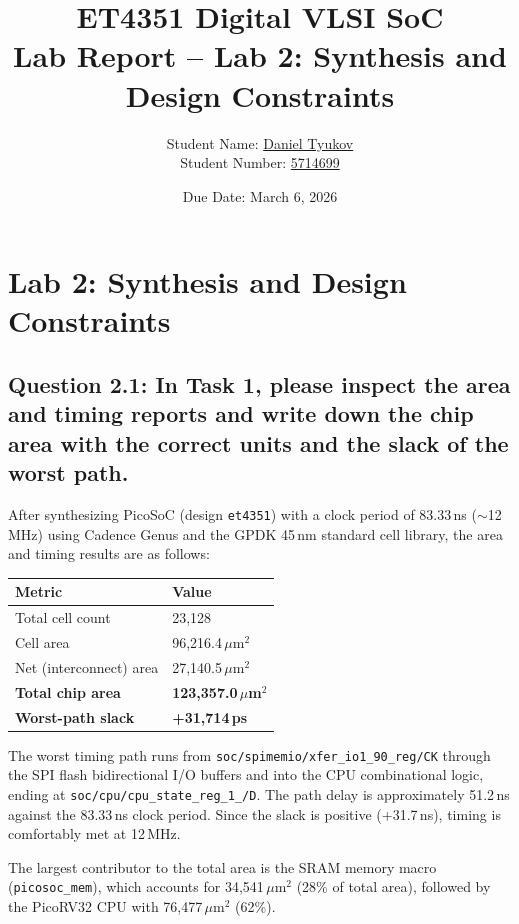 \documentclass{article}
\title{
\vspace{-1.5cm}
\textcolor{tudelft}{\textbf{ET4351 Digital VLSI SoC \\ Lab Report -- Lab 2: Synthesis and Design Constraints}}
\vspace{0.5cm}
}
\author{Student Name: \underline{\hspace{1cm}Daniel Tyukov\hspace{1cm}} \\Student Number: \underline{\hspace{1cm}5714699\hspace{1cm}}}
\date{Due Date: March 6, 2026}
\begin{document}
\maketitle
\thispagestyle{fancy}

\section{Lab 2: Synthesis and Design Constraints}


\subsection*{Question 2.1: In Task 1, please inspect the area and timing reports and write down the chip area with the correct units and the slack of the worst path.}

\begin{tcolorbox}[colback=white, colframe=black, width=\textwidth, title=Answer 2.1]

After synthesizing PicoSoC (design \texttt{et4351}) with a clock period of 83.33\,ns ($\sim$12\,MHz) using Cadence Genus and the GPDK 45\,nm standard cell library, the area and timing results are as follows:

\vspace{0.3cm}

\begin{tabular}{@{}ll@{}}
\toprule
\textbf{Metric} & \textbf{Value} \\
\midrule
Total cell count & 23{,}128 \\
Cell area & 96{,}216.4\,$\mu$m$^2$ \\
Net (interconnect) area & 27{,}140.5\,$\mu$m$^2$ \\
\textbf{Total chip area} & \textbf{123{,}357.0\,$\mu$m$^2$} \\
\midrule
\textbf{Worst-path slack} & \textbf{+31{,}714\,ps} \\
\bottomrule
\end{tabular}

\vspace{0.3cm}

The worst timing path runs from \texttt{soc/spimemio/xfer\_io1\_90\_reg/CK} through the SPI flash bidirectional I/O buffers and into the CPU combinational logic, ending at \texttt{soc/cpu/cpu\_state\_reg\_1\_/D}. The path delay is approximately 51.2\,ns against the 83.33\,ns clock period. Since the slack is positive (+31.7\,ns), timing is comfortably met at 12\,MHz.

The largest contributor to the total area is the SRAM memory macro (\texttt{picosoc\_mem}), which accounts for 34{,}541\,$\mu$m$^2$ (28\% of total area), followed by the PicoRV32 CPU with 76{,}477\,$\mu$m$^2$ (62\%).

\end{tcolorbox}
\end{document}
